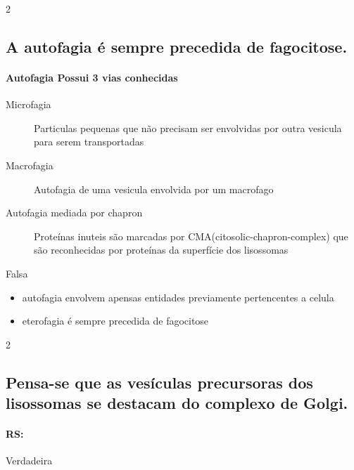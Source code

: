 \documentclass[\mainfilename]{subfiles}
\begin{document}
\begin{questionBox}2{} %
    
    \subsection*{A autofagia é sempre precedida de fagocitose.}



    \begin{answerBox}{} %

        \paragraph*{Autofagia Possui 3 vias conhecidas}
        \begin{description}
           \item[Microfagia] Particulas pequenas que não precisam ser envolvidas por outra vesicula para serem transportadas
           \item[Macrofagia] Autofagia de uma vesicula envolvida por um macrofago
           \item[Autofagia mediada por chapron] Proteínas inuteis são marcadas por CMA(citosolic-chapron-complex) que são reconhecidas por proteínas da superfície dos lisossomas
        \end{description}

        Falsa
        \begin{itemize}
            \item autofagia envolvem apensas entidades previamente pertencentes a celula
            \item eterofagia é sempre precedida de fagocitose
        \end{itemize}
    \end{answerBox}

\end{questionBox}

\begin{questionBox}2{} %
    
    \subsection*{Pensa-se que as vesículas precursoras dos lisossomas se destacam do complexo de Golgi.}

    \paragraph*{RS:} Verdadeira

\end{questionBox}
\end{document}
